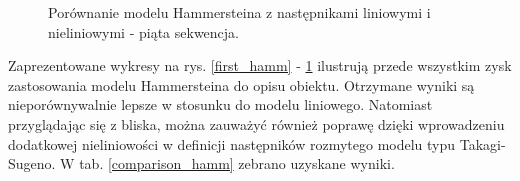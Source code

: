 \begin{figure}[p]
\centering
{}
\vspace{0.5cm}
\caption{Porównanie modelu Hammersteina z następnikami liniowymi i nieliniowymi - piąta sekwencja.}
\label{last_hamm}
\end{figure}

\newpage

Zaprezentowane wykresy na rys. \ref{first_hamm} - \ref{last_hamm} ilustrują przede wszystkim zysk zastosowania modelu Hammersteina do opisu obiektu. Otrzymane wyniki są nieporównywalnie lepsze w stosunku do modelu liniowego. Natomiast przyglądając się z bliska, można zauważyć również poprawę dzięki wprowadzeniu dodatkowej nieliniowości w definicji następników rozmytego modelu typu Takagi-Sugeno. W tab. \ref{comparison_hamm} zebrano uzyskane wyniki.

